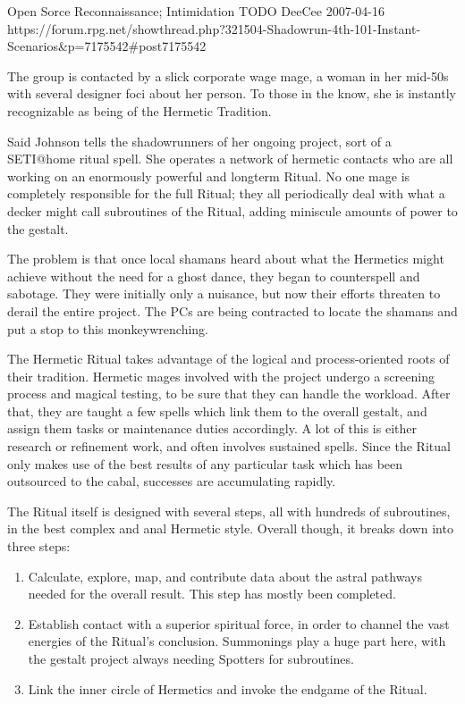\begin{scenario}{Open Sorce}
	{Reconnaissance; Intimidation}
	{TODO}
	{DeeCee}
	{2007-04-16}
	{https://forum.rpg.net/showthread.php?321504-Shadowrun-4th-101-Instant-Scenarios\&p=7175542#post7175542}

The group is contacted by a slick corporate wage mage, a woman in her mid-50s with several designer foci about her person. To those in the know, she is instantly recognizable as being of the Hermetic Tradition.

\synopsis Said Johnson tells the shadowrunners of her ongoing project, sort of a SETI@home ritual spell. She operates a network of hermetic contacts who are all working on an enormously powerful and longterm Ritual. No one mage is completely responsible for the full Ritual; they all periodically deal with what a decker might call subroutines of the Ritual, adding miniscule amounts of power to the gestalt.

The problem is that once local shamans heard about what the Hermetics might achieve without the need for a ghost dance, they began to counterspell and sabotage. They were initially only a nuisance, but now their efforts threaten to derail the entire project. The PCs are being contracted to locate the shamans and put a stop to this monkeywrenching.

\notes The Hermetic Ritual takes advantage of the logical and process-oriented roots of their tradition. Hermetic mages involved with the project undergo a screening process and magical testing, to be sure that they can handle the workload. After that, they are taught a few spells which link them to the overall gestalt, and assign them tasks or maintenance duties accordingly. A lot of this is either research or refinement work, and often involves sustained spells. Since the Ritual only makes use of the best results of any particular task which has been outsourced to the cabal, successes are accumulating rapidly.

The Ritual itself is designed with several steps, all with hundreds of subroutines, in the best complex and anal Hermetic style. Overall though, it breaks down into three steps:

\begin{enumerate}
\item Calculate, explore, map, and contribute data about the astral pathways needed for the overall result. This step has mostly been completed.
\item Establish contact with a superior spiritual force, in order to channel the vast energies of the Ritual's conclusion. Summonings play a huge part here, with the gestalt project always needing Spotters for subroutines.
\item Link the inner circle of Hermetics and invoke the endgame of the Ritual.
\end{enumerate}


\end{scenario}

